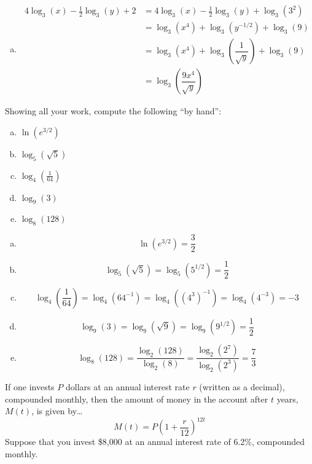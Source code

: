 \documentclass[12pt,letterpaper]{exam}
\begin{document}
\begin{questions}
{\begin{enumerate}[(a)]
\item 
	\[
	\begin{aligned}
	4\log_3(x) - \frac{1}{2} \log_3(y) + 2&= 4\log_3(x) - \frac{1}{2} \log_3(y) + \log_3(3^2) \\[0.3cm]
	&= \log_3(x^4) + \log_3(y^{-1/2}) + \log_3(9) \\[0.3cm]
	&= \log_3(x^4) + \log_3 \left( \dfrac{1}{\sqrt{y}} \right) + \log_3(9) \\[0.3cm]
	&= \log_3 \left( \dfrac{9x^4}{\sqrt{y}} \right)
	\end{aligned}
	\]
\end{enumerate}
}


\newpage
\question[10] Showing all your work, compute the following ``by hand'': 
	\begin{enumerate}[(a)]
	\item $\ln(e^{3/2})$
	\item $\log_5(\sqrt{5})$
	\item $\log_4 \left( \frac{1}{64} \right)$
	\item $\log_9(3)$
	\item $\log_8(128)$
	\end{enumerate} \pspace

{\itshape
\sol 
\begin{enumerate}[(a)]
\item 
	\[
	\ln(e^{3/2})= \dfrac{3}{2}
	\] \pspace 

\item 
	\[
	\log_5(\sqrt{5})= \log_5(5^{1/2})= \dfrac{1}{2}
	\] \pspace 
 
\item 
	\[
	\log_4 \left( \dfrac{1}{64} \right)= \log_4 \left( 64^{-1} \right)= \log_4 \left( (4^3)^{-1} \right)= \log_4 \left( 4^{-3} \right)= -3
	\] \pspace 
 
\item 
	\[
	\log_9(3)= \log_9 (\sqrt{9})= \log_9 (9^{1/2})= \dfrac{1}{2}
	\] \pspace 
 
\item 
	\[
	\log_8(128)= \dfrac{\log_2(128)}{\log_2(8)}= \dfrac{\log_2(2^7)}{\log_2(2^3)}= \dfrac{7}{3}
	\]  
\end{enumerate}
}



\newpage
\question[10] If one invests $P$ dollars at an annual interest rate $r$ (written as a decimal), compounded monthly, then the amount of money in the account after $t$ years, $M(t)$, is given by\dots
	\[
	M(t)= P \left(1 + \dfrac{r}{12} \right)^{12t}
	\]
Suppose that you invest \$8,000 at an annual interest rate of 6.2\%, compounded monthly. 


\end{questions}
\end{document}
